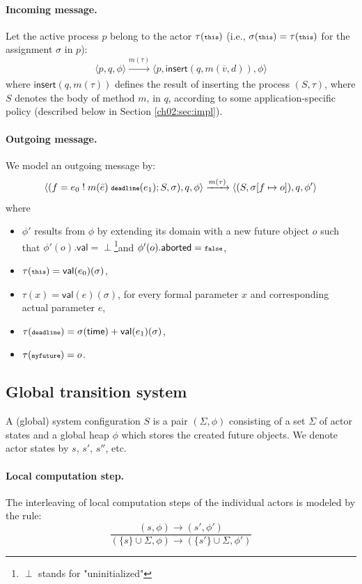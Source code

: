 \paragraph*{Incoming message.}
Let the active process $p$ belong to the actor $\tau({\scriptsize\texttt{this}})$ (i.e., 
 $\sigma({\scriptsize\texttt{this}})=\tau({\scriptsize\texttt{this}})$ for the assignment $\sigma$ in $p$):
$$
\langle p , q, \phi\rangle \xrightarrow[]{m(\tau)}  \langle p , \mathsf{insert}(q, m(\overline{v}, d)), \phi\rangle
$$
where   $\mathsf{insert}(q, m(\tau))$  defines the result of inserting the process  $(S,\tau)$, where $S$ denotes the body of method $m$,
in $q$, according to some application-specific policy (described below in Section \ref{ch02:sec:impl}).


\paragraph*{Outgoing message.} 
We model an outgoing message by:
$$
\langle (f = e_0 \; ! \; m(\bar{e}) \; \textbf{{\scriptsize\texttt{deadline}}}(e_1);S,\sigma)  , q, \phi\rangle 
\xrightarrow[]{m(\tau)} 
\langle (S,\sigma[f\mapsto o])  , q, \phi' \rangle 
$$
where 
\begin{itemize}
\item $\phi'$ results from $\phi$ by extending its domain  with a new future object $o$
such that $\phi'(o).\textsf{val}=\perp$\footnote{$\perp$ stands for "uninitialized"}and $\phi'(o).\textsf{aborted}={\scriptsize\texttt{false}}$,
 \item $\tau({\scriptsize\texttt{this}})=\textsf{val}(e_0)(\sigma)$,
 \item $\tau(x)= \textsf{val}(e)(\sigma)$, for every formal parameter $x$ and corresponding actual parameter $e$, 
 \item $\tau({\scriptsize\texttt{deadline}})=\sigma(\mathsf{time})+ \textsf{val}(e_1)(\sigma)$,
  \item  $\tau({\scriptsize\texttt{myfuture}})=o$.
\end{itemize}

\subsection{Global transition system}
A (global) system configuration $S$ is a pair $(\Sigma, \phi)$ consisting of a set $\Sigma$
of actor states and a global heap $\phi$ which stores the created future objects.
We denote actor states by $s$, $s'$, $s''$, etc.

\paragraph*{Local computation step.} 
The interleaving of local computation steps of the individual actors is
modeled by the rule:
$$
\frac{(s, \phi) \rightarrow (s', \phi')}
{(\{s\}\cup\Sigma, \phi)\rightarrow (\{s'\}\cup\Sigma, \phi')}
$$

